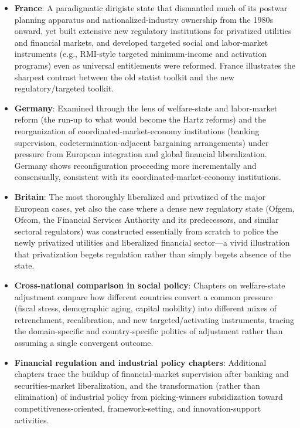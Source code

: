 \documentclass[12pt]{article}
\begin{document}
\begin{itemize}[leftmargin=*, itemsep=4pt]
    \item \textbf{France}: A paradigmatic dirigiste state that dismantled much of its postwar planning apparatus and nationalized-industry ownership from the 1980s onward, yet built extensive new regulatory institutions for privatized utilities and financial markets, and developed targeted social and labor-market instruments (e.g., RMI-style targeted minimum-income and activation programs) even as universal entitlements were reformed. France illustrates the sharpest contrast between the old statist toolkit and the new regulatory/targeted toolkit.
    \item \textbf{Germany}: Examined through the lens of welfare-state and labor-market reform (the run-up to what would become the Hartz reforms) and the reorganization of coordinated-market-economy institutions (banking supervision, codetermination-adjacent bargaining arrangements) under pressure from European integration and global financial liberalization. Germany shows reconfiguration proceeding more incrementally and consensually, consistent with its coordinated-market-economy institutions.
    \item \textbf{Britain}: The most thoroughly liberalized and privatized of the major European cases, yet also the case where a dense new regulatory state (Ofgem, Ofcom, the Financial Services Authority and its predecessors, and similar sectoral regulators) was constructed essentially from scratch to police the newly privatized utilities and liberalized financial sector---a vivid illustration that privatization begets regulation rather than simply begets absence of the state.
    \item \textbf{Cross-national comparison in social policy}: Chapters on welfare-state adjustment compare how different countries convert a common pressure (fiscal stress, demographic aging, capital mobility) into different mixes of retrenchment, recalibration, and new targeted/activating instruments, tracing the domain-specific and country-specific politics of adjustment rather than assuming a single convergent outcome.
    \item \textbf{Financial regulation and industrial policy chapters}: Additional chapters trace the buildup of financial-market supervision after banking and securities-market liberalization, and the transformation (rather than elimination) of industrial policy from picking-winners subsidization toward competitiveness-oriented, framework-setting, and innovation-support activities.
\end{itemize}
\end{document}
